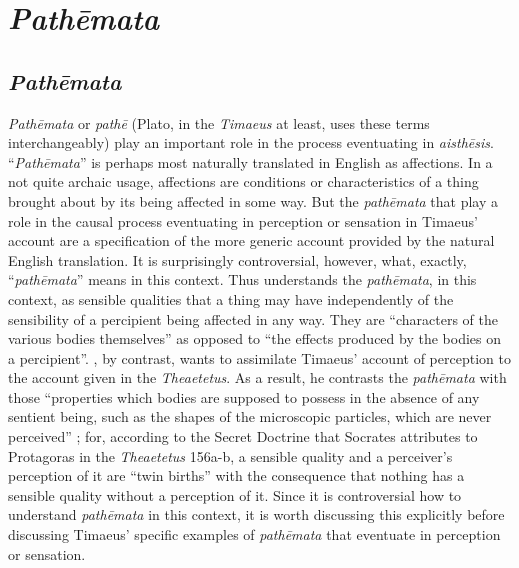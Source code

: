 
\chapter{\emph{Pathēmata}} %
\label{cha:pathemata}

\section{\emph{Pathēmata}} %
\label{sec:pathemata}

\emph{Pathēmata} or \emph{pathē} (Plato, in the \emph{Timaeus} at least, uses these terms interchangeably) play an important role in the process eventuating in \emph{aisthēsis}. ``\emph{Pathēmata}'' is perhaps most naturally translated in English as affections. In a not quite archaic usage, affections are conditions or characteristics of a thing brought about by its being affected in some way. But the \emph{pathēmata} that play a role in the causal process eventuating in perception or sensation in Timaeus' account are a specification of the more generic account provided by the natural English translation. It is surprisingly controversial, however, what, exactly, ``\emph{pathēmata}'' means in this context. Thus \citet[429-31]{Taylor:1928qb} understands the \emph{pathēmata}, in this context, as sensible qualities that a thing may have independently of the sensibility of a percipient being affected in any way. They are ``characters of the various bodies themselves'' as opposed to ``the effects produced by the bodies on a percipient''. \citet[258-9]{Cornford:1935fk}, by contrast, wants to assimilate Timaeus' account of perception to the account given in the \emph{Theaetetus}. As a result, he contrasts the \emph{pathēmata} with those ``properties which bodies are supposed to possess in the absence of any sentient being, such as the shapes of the microscopic particles, which are never perceived'' \citep[259]{Cornford:1935fk}; for, according to the Secret Doctrine that Socrates attributes to Protagoras in the \emph{Theaetetus} 156a-b, a sensible quality and a perceiver's perception of it are ``twin births'' with the consequence that nothing has a sensible quality without a perception of it. Since it is controversial how to understand \emph{pathēmata} in this context, it is worth discussing this explicitly before discussing Timaeus' specific examples of \emph{pathēmata} that eventuate in perception or sensation.

